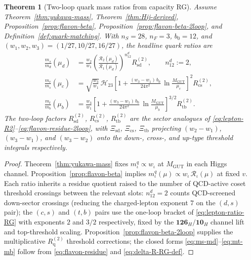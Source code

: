 \documentclass[11pt]{article}
\theoremstyle{plain}
\newtheorem{theorem}{Theorem}[section]
\theoremstyle{definition}
\theoremstyle{remark}
\numberwithin{equation}{section}
\begin{document}
\begin{theorem}[Two-loop quark mass ratios from capacity RG]
\label{thm:quark-mass-2loop}
Assume Theorem~\ref{thm:yukawa-mass}, Theorem~\ref{thm:Hij-derived},
Proposition~\ref{prop:flavon-beta}, Proposition~\ref{prop:flavon-beta-2loop},
and Definition~\ref{def:quark-matching}. With
$n_S=28$, $n_F=3$, $b_0=12$, and $(w_1,w_2,w_3)=(1/27,10/27,16/27)$,
the headline quark ratios are
\begin{align}
  \frac{m_s}{m_d}(\mu_d)
  &=
  \frac{w_2}{w_1}
  \left(
    \frac{\mathcal{R}_2(\mu_d)}{\mathcal{R}_1(\mu_d)}
  \right)^{\!n_{12}^{d}}
  R_{\mathrm{sd}}^{(2)},
  \qquad
  n_{12}^{d} := 2,
  \label{eq:ms-md}\\
  \frac{m_c}{m_s}(\mu_c)
  &=
  \sqrt{\frac{w_3}{w_1}}\,
  \mathcal{H}_{23}
  \left[
    1
    +
    \frac{(w_3-w_1)\,b_0}{24\pi^2}\,
    \ln\!\frac{M_{\mathrm{GUT}}}{\mu_c}
  \right]^{\!2}
  R_{\mathrm{cs}}^{(2)},
  \label{eq:mc-ms}\\
  \frac{m_t}{m_b}(\mu_b)
  &=
  \frac{w_3}{w_1}
  \left[
    1
    +
    \frac{(w_3-w_1)\,b_0}{24\pi^2}\,
    \ln\!\frac{M_{\mathrm{GUT}}}{\mu_b}
  \right]^{\!3/2}
  R_{\mathrm{tb}}^{(2)}.
  \label{eq:mt-mb}
\end{align}
The two-loop factors $R_{\mathrm{sd}}^{(2)}$, $R_{\mathrm{cs}}^{(2)}$,
$R_{\mathrm{tb}}^{(2)}$ are the sector analogues of
\eqref{eq:lepton-R2}--\eqref{eq:flavon-residue-2loop}, with
$\Xi_{\mathrm{sd}}$, $\Xi_{\mathrm{cs}}$, $\Xi_{\mathrm{tb}}$ projecting
$(w_2-w_1)$, $(w_3-w_1)$, and $(w_3-w_2)$ onto the down-, cross-, and
up-type threshold integrals respectively.
\end{theorem}

\begin{proof}
Theorem~\ref{thm:yukawa-mass} fixes $m_\iota^q\propto w_\iota$ at
$M_{\mathrm{GUT}}$ in each Higgs channel.
Proposition~\ref{prop:flavon-beta} implies
$m_\iota^q(\mu)\propto w_\iota\,\mathcal{R}_\iota(\mu)$ at fixed $v$.
Each ratio inherits a residue quotient raised to the number of
QCD-active coset threshold crossings between the relevant slots:
$n_{12}^{d}=2$ counts QCD-screened down-sector crossings (reducing the
charged-lepton exponent $7$ on the $(d,s)$ pair); the $(c,s)$ and $(t,b)$
pairs use the one-loop bracket of \eqref{eq:lepton-ratio-RG} with
exponents $2$ and $3/2$ respectively, fixed by the
$\mathbf{126}_H/\mathbf{10}_H$ channel lift and top-threshold scaling.
Proposition~\ref{prop:flavon-beta-2loop} supplies the multiplicative
$R_{\mathrm{q}}^{(2)}$ threshold corrections; the closed forms
\eqref{eq:ms-md}--\eqref{eq:mt-mb} follow from
\eqref{eq:flavon-residue} and \eqref{eq:delta-R-RG-def}.
\end{proof}
\end{document}
